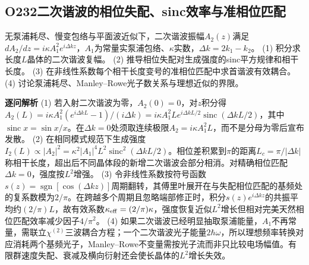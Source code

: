 \subsection*{O232\quad 二次谐波的相位失配、sinc效率与准相位匹配}
无泵浦耗尽、慢变包络与平面波近似下，二次谐波振幅$A_2(z)$满足$dA_2/dz=i\kappa A_1^2 e^{i\Delta k z}$，$A_1$为常量实泵浦包络、$\kappa$实数，$\Delta k=2k_1-k_2$。
(1) 积分求长度$L$晶体的二次谐波复幅。
(2) 推导相位失配对生成强度的sinc平方规律和相干长度。
(3) 在非线性系数每个相干长度变号的准相位匹配中求首谐波有效耦合。
(4) 讨论泵浦耗尽、Manley–Rowe光子数关系与理想近似的界限。
\par\textbf{逐问解析}
(1) 若入射二次谐波为零，$A_2(0)=0$，对$z$积分得$A_2(L)=i\kappa A_1^2(e^{i\Delta kL}-1)/(i\Delta k)=i\kappa A_1^2 L e^{i\Delta k L/2}\operatorname{sinc}(\Delta k L/2)$，其中$\operatorname{sinc}x=\sin x/x$。在$\Delta k=0$处须取连续极限$A_2=i\kappa A_1^2 L$，而不是分母为零后宣布发散。
(2) 在相同模式规范下生成强度$I_2(L)\propto|A_2|^2=\kappa^2|A_1|^4L^2\operatorname{sinc}^2(\Delta kL/2)$。相位差积累到$\pi$的距离$L_c=\pi/|\Delta k|$称相干长度，超出后不同晶体段的新增二次谐波会部分相消。对精确相位匹配$\Delta k=0$，强度按$L^2$增强。
(3) 令非线性系数按符号函数$s(z)=\operatorname{sgn}[\cos(\Delta k z)]$周期翻转，其傅里叶展开在与失配相位匹配的基频处的复系数模为$2/\pi$。在跨越多个周期且忽略端部修正时，积分$s(z)e^{i\Delta kz}$的共振平均约$(2/\pi)L$，故有效系数$\kappa_{\rm eff}=(2/\pi)\kappa$，强度恢复近似$L^2$增长但相对完美天然相位匹配效率减少因子$4/\pi^2$。
(4) 如果二次谐波已经明显抽取泵浦能量，$A_1$不再常量，需联立$\chi^{(2)}$三波耦合方程；一个二次谐波光子能量$2\hbar\omega$，所以理想频率转换对应消耗两个基频光子，Manley–Rowe不变量需按光子流而非只比较电场幅值。有限群速度失配、衰减及横向衍射还会使长晶体的$L^2$增长失效。
\par\medskip
